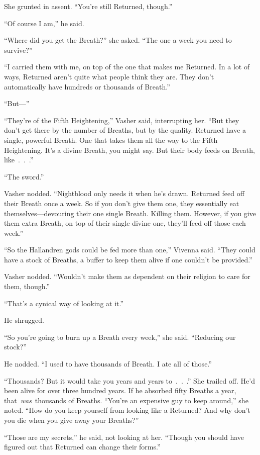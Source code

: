 She grunted in assent. “You’re still Returned, though.”

“Of course I am,” he said.

“Where did you get the Breath?” she asked. “The one a week you need to survive?”

“I carried them with me, on top of the one that makes me Returned. In a lot of ways, Returned aren’t quite what people think they are. They don’t automatically have hundreds or thousands of Breath.”

“But—”

“They’re of the Fifth Heightening,” Vasher said, interrupting her. “But they don’t get there by the number of Breaths, but by the quality. Returned have a single, powerful Breath. One that takes them all the way to the Fifth Heightening. It’s a divine Breath, you might say. But their body feeds on Breath, like~.~.~.”

“The sword.”

Vasher nodded. “Nightblood only needs it when he’s drawn. Returned feed off their Breath once a week. So if you don’t give them one, they essentially eat themselves—devouring their one single Breath. Killing them. However, if you give them extra Breath, on top of their single divine one, they’ll feed off those each week.”

“So the Hallandren gods could be fed more than one,” Vivenna said. “They could have a stock of Breaths, a buffer to keep them alive if one couldn’t be provided.”

Vasher nodded. “Wouldn’t make them as dependent on their religion to care for them, though.”

“That’s a cynical way of looking at it.”

He shrugged.

“So you’re going to burn up a Breath every week,” she said. “Reducing our stock?”

He nodded. “I used to have thousands of Breath. I ate all of those.”

“Thousands? But it would take you years and years to~.~.~.” She trailed off. He’d been alive for over three hundred years. If he absorbed fifty Breaths a year, that~\textit{was}~thousands of Breaths. “You’re an expensive guy to keep around,” she noted. “How do you keep yourself from looking like a Returned? And why don’t you die when you give away your Breaths?”

“Those are my secrets,” he said, not looking at her. “Though you should have figured out that Returned can change their forms.”

